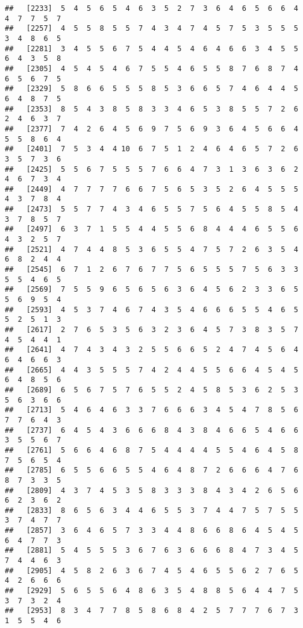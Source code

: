 \documentclass[
]{book}
\begin{document}
\begin{verbatim}
##   [2233]  5  4  5  6  5  4  6  3  5  2  7  3  6  4  6  5  6  6  4  4  7  7  5  7
##   [2257]  4  5  5  8  5  5  7  4  3  4  7  4  5  7  5  3  5  5  5  3  4  8  6  5
##   [2281]  3  4  5  5  6  7  5  4  4  5  4  6  4  6  6  3  4  5  5  6  4  3  5  8
##   [2305]  4  5  4  5  4  6  7  5  5  4  6  5  5  8  7  6  8  7  4  6  5  6  7  5
##   [2329]  5  8  6  6  5  5  5  8  5  3  6  6  5  7  4  6  4  4  5  6  4  8  7  5
##   [2353]  8  5  4  3  8  5  8  3  3  4  6  5  3  8  5  5  7  2  6  2  4  6  3  7
##   [2377]  7  4  2  6  4  5  6  9  7  5  6  9  3  6  4  5  6  6  4  5  5  8  6  4
##   [2401]  7  5  3  4  4 10  6  7  5  1  2  4  6  4  6  5  7  2  6  3  5  7  3  6
##   [2425]  5  5  6  7  5  5  5  7  6  6  4  7  3  1  3  6  3  6  2  4  6  7  3  4
##   [2449]  4  7  7  7  7  6  6  7  5  6  5  3  5  2  6  4  5  5  5  4  3  7  8  4
##   [2473]  5  5  7  7  4  3  4  6  5  5  7  5  6  4  5  5  8  5  4  3  7  8  5  7
##   [2497]  6  3  7  1  5  5  4  4  5  5  6  8  4  4  4  6  5  5  6  4  3  2  5  7
##   [2521]  4  7  4  4  8  5  3  6  5  5  4  7  5  7  2  6  3  5  4  6  8  2  4  4
##   [2545]  6  7  1  2  6  7  6  7  7  5  6  5  5  5  7  5  6  3  3  5  5  4  6  5
##   [2569]  7  5  5  9  6  5  6  5  6  3  6  4  5  6  2  3  3  6  5  5  6  9  5  4
##   [2593]  4  5  3  7  4  6  7  4  3  5  4  6  6  6  5  5  4  6  5  5  2  5  1  3
##   [2617]  2  7  6  5  3  5  6  3  2  3  6  4  5  7  3  8  3  5  7  4  5  4  4  1
##   [2641]  4  7  4  3  4  3  2  5  5  6  6  5  2  4  7  4  5  6  4  6  4  6  6  3
##   [2665]  4  4  3  5  5  5  7  4  2  4  4  5  5  6  6  4  5  4  5  6  4  8  5  6
##   [2689]  6  5  6  7  5  7  6  5  5  2  4  5  8  5  3  6  2  5  3  5  6  3  6  6
##   [2713]  5  4  6  4  6  3  3  7  6  6  6  3  4  5  4  7  8  5  6  7  7  6  4  3
##   [2737]  6  4  5  4  3  6  6  6  8  4  3  8  4  6  6  5  4  6  6  3  5  5  6  7
##   [2761]  5  6  6  4  6  8  7  5  4  4  4  4  5  5  4  6  4  5  8  7  5  6  5  4
##   [2785]  6  5  5  6  6  5  5  4  6  4  8  7  2  6  6  6  4  7  6  8  7  3  3  5
##   [2809]  4  3  7  4  5  3  5  8  3  3  3  8  4  3  4  2  6  5  6  6  2  3  6  2
##   [2833]  8  6  5  6  3  4  4  6  5  5  3  7  4  4  7  5  7  5  5  3  7  4  7  7
##   [2857]  3  6  4  6  5  7  3  3  4  4  8  6  6  8  6  4  5  4  5  6  4  7  7  3
##   [2881]  5  4  5  5  5  3  6  7  6  3  6  6  6  8  4  7  3  4  5  7  4  4  6  3
##   [2905]  4  5  8  2  6  3  6  7  4  5  4  6  5  5  6  2  7  6  5  4  2  6  6  6
##   [2929]  5  6  5  5  6  4  8  6  3  5  4  8  8  5  6  4  4  7  5  3  7  3  2  4
##   [2953]  8  3  4  7  7  8  5  8  6  8  4  2  5  7  7  7  6  7  3  1  5  5  4  6

\end{verbatim}
\end{document}
